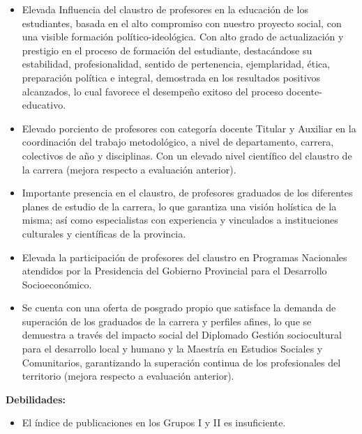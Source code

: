\begin{itemize}
	\setlength\itemsep{-0.5em}
	\item Elevada Influencia del claustro de profesores en la educación de los estudiantes, basada en el alto compromiso con nuestro proyecto social, con una visible formación político-ideológica. Con alto grado de actualización y prestigio en el proceso de formación del estudiante, destacándose su estabilidad, profesionalidad, sentido de pertenencia, ejemplaridad, ética, preparación política e integral, demostrada en los resultados positivos alcanzados, lo cual favorece el desempeño exitoso del proceso docente-educativo. 
	\item Elevado porciento de profesores con categoría docente Titular y Auxiliar en la coordinación del trabajo metodológico, a nivel de departamento, carrera, colectivos de año y disciplinas. Con un elevado nivel científico del claustro de la carrera (mejora respecto a evaluación anterior).
	\item Importante presencia en el claustro, de profesores graduados de los diferentes planes de estudio de la carrera, lo que garantiza una visión holística de la misma; así como especialistas con experiencia y vinculados a instituciones culturales y científicas de la provincia.
	\item Elevada la participación de profesores del claustro en Programas Nacionales atendidos por la Presidencia del Gobierno Provincial para el Desarrollo Socioeconómico.
	\item Se cuenta con una oferta de posgrado propio que satisface la demanda de superación de los graduados de la carrera y perfiles afines, lo que se demuestra a través del impacto social del Diplomado Gestión sociocultural para el desarrollo local y humano y la Maestría en Estudios Sociales y Comunitarios, garantizando la superación continua de los profesionales del territorio (mejora respecto a evaluación anterior).
\end{itemize}

\textbf{Debilidades:}

\begin{itemize}
	\setlength\itemsep{-0.5em}
	\item El índice de publicaciones en los Grupos I y II es insuficiente.
\end{itemize}